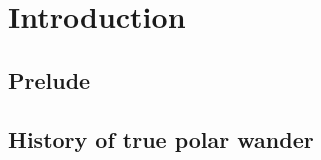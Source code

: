 \chapter{Introduction}
\label{c:intro}

\section{Prelude}

\section{History of true polar wander}

\citet{darwin1887influence}
\citet{koppen1924}

\citet{creer1954direction} 
\citet{runcorn1955rock}
\citet{creer1957geophysical}

\citet{irving1958polar}
\citet{gold1955instability}

\citet{munk1956polar}

\citet{munk1960rotation}

\citet{goldreich1969some}

\citet{ricard1993polar}

\citet{kirschvink1997evidence}



